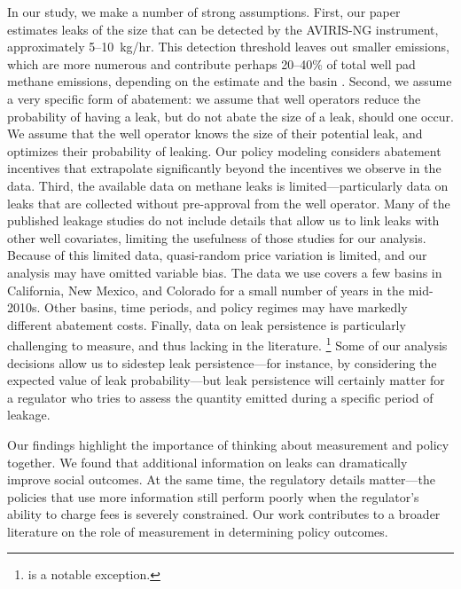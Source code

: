 \documentclass[12pt,oneside,letterpaper]{article}
\theoremstyle{definition}
\begin{document}
\begin{refsection}
In our study, we make a number of strong assumptions.
First, our paper estimates leaks of the size that can be detected by the \gls{AVIRIS-NG} instrument, approximately 5--10~kg/hr.
This detection threshold leaves out smaller emissions, which are more numerous and contribute perhaps 20--40\% of total well pad methane emissions, depending on the estimate and the basin \parencite{Sherwin/etal:2023}.
Second, we assume a very specific form of abatement: we assume that well operators reduce the probability of having a leak, but do not abate the size of a leak, should one occur.
We assume that the well operator knows the size of their potential leak, and optimizes their probability of leaking.
Our policy modeling considers abatement incentives that extrapolate significantly beyond the incentives we observe in the data.
Third, the available data on methane leaks is limited---particularly data on leaks that are collected without pre-approval from the well operator.
Many of the published leakage studies do not include details that allow us to link leaks with other well covariates, limiting the usefulness of those studies for our analysis.
Because of this limited data, quasi-random price variation is limited, and our analysis may have omitted variable bias.
The data we use covers a few basins in California, New Mexico, and Colorado for a small number of years in the mid-2010s.
Other basins, time periods, and policy regimes may have markedly different abatement costs.
Finally, data on leak persistence is particularly challenging to measure, and thus lacking in the literature.%
\footnote{\textcite{Wang/Daniels/Hammerling/Harrison/Burmaster/George/Ravikumar:2022} is a notable exception.}
Some of our analysis decisions allow us to sidestep leak persistence---for instance, by considering the expected value of leak probability---but leak persistence will certainly matter for a regulator who tries to assess the quantity emitted during a specific period of leakage.


Our findings highlight the importance of thinking about measurement and policy together.
We found that additional information on leaks can dramatically improve social outcomes.
At the same time, the regulatory details matter---the policies that use more information still perform poorly when the regulator's ability to charge fees is severely constrained.
Our work contributes to a broader literature on the role of measurement in determining policy outcomes.




\clearpage
\begin{RaggedRight}
\twocolumn
{\singlespacing
\printbibliography
}
\end{RaggedRight}
\end{refsection}
\onecolumn
\newpage
\end{document}
